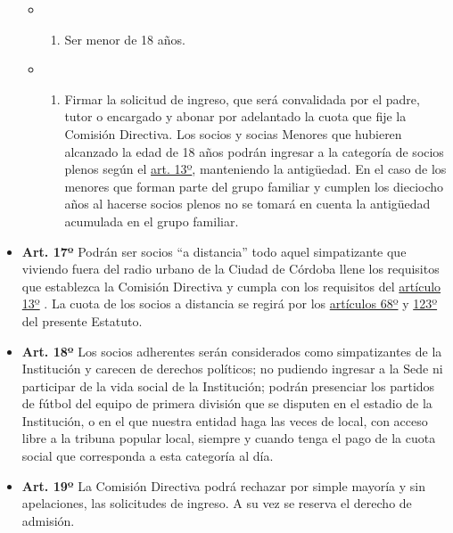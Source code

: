 \documentclass[]{book}
\providecommand{\tightlist}{%
  \setlength{\itemsep}{0pt}\setlength{\parskip}{0pt}}
\begin{document}
\begin{itemize}
  \begin{itemize}
  \item
    \begin{enumerate}
    \def\labelenumi{\alph{enumi})}
    \tightlist
    \item
      Ser menor de 18 años.
    \end{enumerate}
  \item
    \begin{enumerate}
    \def\labelenumi{\alph{enumi})}
    \setcounter{enumi}{1}
    \tightlist
    \item
      Firmar la solicitud de ingreso, que será convalidada por el padre,
      tutor o encargado y abonar por adelantado la cuota que fije la
      Comisión Directiva. Los socios y socias Menores que hubieren
      alcanzado la edad de 18 años podrán ingresar a la categoría de
      socios plenos según el \protect\hyperlink{art13}{art. 13º},
      manteniendo la antigüedad. En el caso de los menores que forman
      parte del grupo familiar y cumplen los dieciocho años al hacerse
      socios plenos no se tomará en cuenta la antigüedad acumulada en el
      grupo familiar.
    \end{enumerate}
  \end{itemize}
\item
  \textbf{Art. 17º} Podrán ser socios ``a distancia'' todo aquel
  simpatizante que viviendo fuera del radio urbano de la Ciudad de
  Córdoba llene los requisitos que establezca la Comisión Directiva y
  cumpla con los requisitos del \protect\hyperlink{art13}{artículo 13º}
  . La cuota de los socios a distancia se regirá por los
  \protect\hyperlink{art68}{artículos 68º} y
  \protect\hyperlink{art123}{123º} del presente Estatuto.
\item
  \textbf{Art. 18º} Los socios adherentes serán considerados como
  simpatizantes de la Institución y carecen de derechos políticos; no
  pudiendo ingresar a la Sede ni participar de la vida social de la
  Institución; podrán presenciar los partidos de fútbol del equipo de
  primera división que se disputen en el estadio de la Institución, o en
  el que nuestra entidad haga las veces de local, con acceso libre a la
  tribuna popular local, siempre y cuando tenga el pago de la cuota
  social que corresponda a esta categoría al día.
\item
  \textbf{Art. 19º} La Comisión Directiva podrá rechazar por simple
  mayoría y sin apelaciones, las solicitudes de ingreso. A su vez se
  reserva el derecho de admisión.
\end{itemize}
\end{document}
